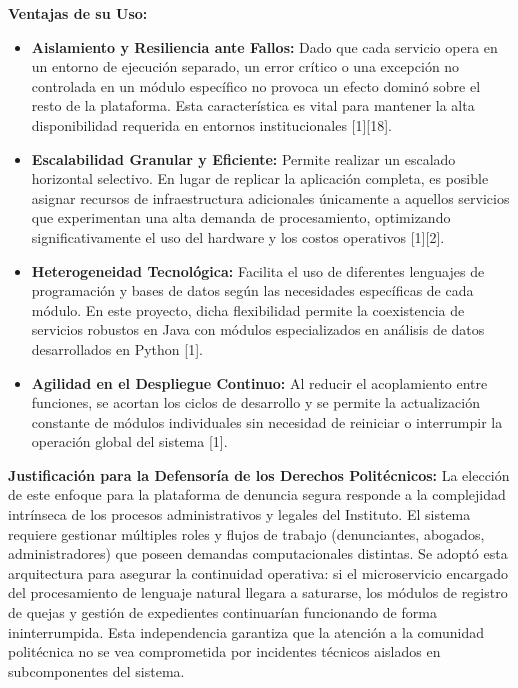 \textbf{Ventajas de su Uso:}
\begin{itemize}
    \item \textbf{Aislamiento y Resiliencia ante Fallos:} Dado que cada servicio opera en un entorno de ejecución separado, un error crítico o una excepción no controlada en un módulo específico no provoca un efecto dominó sobre el resto de la plataforma. Esta característica es vital para mantener la alta disponibilidad requerida en entornos institucionales [1][18].
    
    \item \textbf{Escalabilidad Granular y Eficiente:} Permite realizar un escalado horizontal selectivo. En lugar de replicar la aplicación completa, es posible asignar recursos de infraestructura adicionales únicamente a aquellos servicios que experimentan una alta demanda de procesamiento, optimizando significativamente el uso del hardware y los costos operativos [1][2].
    
    \item \textbf{Heterogeneidad Tecnológica:} Facilita el uso de diferentes lenguajes de programación y bases de datos según las necesidades específicas de cada módulo. En este proyecto, dicha flexibilidad permite la coexistencia de servicios robustos en Java con módulos especializados en análisis de datos desarrollados en Python [1].
    
    \item \textbf{Agilidad en el Despliegue Continuo:} Al reducir el acoplamiento entre funciones, se acortan los ciclos de desarrollo y se permite la actualización constante de módulos individuales sin necesidad de reiniciar o interrumpir la operación global del sistema [1].
\end{itemize}

\textbf{Justificación para la Defensoría de los Derechos Politécnicos:}
La elección de este enfoque para la plataforma de denuncia segura responde a la complejidad intrínseca de los procesos administrativos y legales del Instituto. El sistema requiere gestionar múltiples roles y flujos de trabajo (denunciantes, abogados, administradores) que poseen demandas computacionales distintas. Se adoptó esta arquitectura para asegurar la continuidad operativa: si el microservicio encargado del procesamiento de lenguaje natural llegara a saturarse, los módulos de registro de quejas y gestión de expedientes continuarían funcionando de forma ininterrumpida. Esta independencia garantiza que la atención a la comunidad politécnica no se vea comprometida por incidentes técnicos aislados en subcomponentes del sistema.


